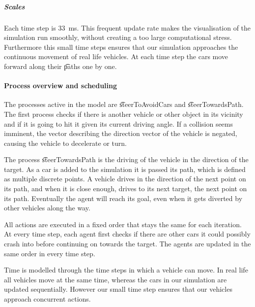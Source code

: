 	\subparagraph{Scales}
	Each time step is \si{33 \milli\second}. This frequent update rate makes the visualisation of the simulation run smoothly, without creating a too large computational stress. Furthermore this small time steps ensures that our simulation approaches the continuous movement of real life vehicles. 
	At each time step the cars move forward along their \t{paths} one by one. 





\paragraph{Process overview and scheduling}
\label{par:method:model:overview:process}
The processes active in the model are \t{steerToAvoidCars} and \t{steerTowardsPath}. The first process checks if there is another vehicle or other object in its vicinity and if it is going to hit it given its current driving angle. If a collision seems imminent, the vector describing the direction vector of the vehicle is negated, causing the vehicle to decelerate or turn.

The process \t{steerTowardsPath} is the driving of the vehicle in the direction of the target. As a car is added to the simulation it is passed its path, which is defined as multiple discrete points.  A vehicle drives in the direction of the next point on its path, and when it is close enough, drives to its next target, the next point on its path. Eventually the agent will reach its goal, even when it gets diverted by other vehicles along the way.

All actions are executed in a fixed order that stays the same for each iteration. At every time step, each agent first checks if there are other cars it could possibly crash into before continuing on towards the target. The agents are updated in the same order in every time step.

Time is modelled through the time steps in which a vehicle can move. In real life all vehicles move at the same time, whereas the cars in our simulation are updated sequentially. However our small time step ensures that our vehicles approach concurrent actions. 


